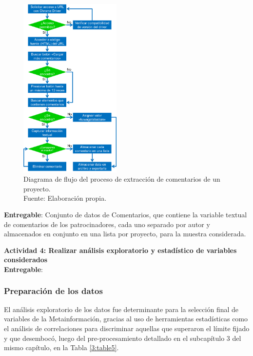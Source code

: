 \begin{figure}[h]
	\begin{center}
		\includegraphics[width=0.45\textwidth]{3/figures/diagrama_flujo_scrapping_comentarios.png}
		\caption[Diagrama de flujo del proceso de extracción de comentarios de un proyecto]{Diagrama de flujo del proceso de extracción de comentarios de un proyecto.\\
			Fuente: Elaboración propia.}
		\label{3:fig6}
	\end{center}
\end{figure}

\textbf{Entregable}: Conjunto de datos de Comentarios, que contiene la variable textual de comentarios de los patrocinadores, cada uno separado por autor y almacenados en conjunto en una lista por proyecto, para la muestra considerada.

\textbf{Actividad 4: Realizar análisis exploratorio y estadístico de variables considerados}
\\

\textbf{Entregable}:

\subsubsection{Preparación de los datos}
El análisis exploratorio de los datos fue determinante para la selección final de variables de la Metainformación, gracias al uso de herramientas estadísticas como el análisis de correlaciones para discriminar aquellas que superaron el límite fijado y que desembocó, luego del pre-procesamiento detallado en el subcapítulo 3 del mismo capítulo, en la Tabla \ref{3:table5}.

